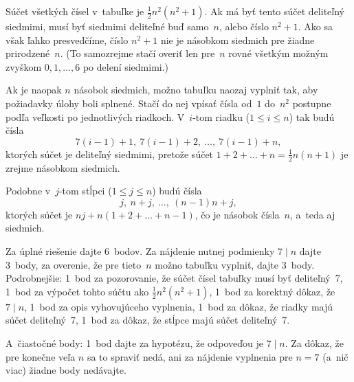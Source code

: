 {%
Súčet všetkých čísel v~tabuľke je $\frac12n^2(n^2+1)$.
Ak má byť tento súčet deliteľný siedmimi, musí byť siedmimi deliteľné
buď samo~$n$, alebo číslo $n^2+1$. Ako sa však ľahko presvedčíme,
číslo $n^2+1$ nie je násobkom siedmich pre žiadne prirodzené~$n$. (To
samozrejme stačí overiť len pre~$n$ rovné všetkým možným zvyškom
$0, 1,\dots, 6$ po delení siedmimi.)

Ak je naopak $n$ násobok siedmich, možno tabuľku naozaj vyplniť tak, aby
požiadavky úlohy boli splnené. Stačí do nej vpísať čísla od~$1$ do~$n^2$
postupne podľa veľkosti po jednotlivých riadkoch.
V~$i$-tom riadku ($1\le i\le n$) tak budú čísla
$$
7(i-1)+1,\ 7(i-1)+2,\ \dots,\ 7(i-1)+n,
$$
ktorých súčet je deliteľný siedmimi, pretože súčet $1+2+\dots+n=\frac12n(n+1)$
je zrejme násobkom siedmich.

Podobne v~$j$-tom stĺpci ($1\le j\le n$) budú čísla
$$
j,\ n+j,\ \dots,\ (n-1) n+j,
$$
ktorých súčet je $nj+n(1+2+\dots+n-1)$, čo je násobok čísla~$n$, a~teda aj siedmich.

\nobreak\medskip\petit\noindent
Za úplné riešenie dajte 6~bodov.
Za nájdenie nutnej podmienky $7\mid n$ dajte 3~body, za overenie,
že pre tieto~$n$ možno tabuľku vyplniť, dajte 3~body.
Podrobnejšie:
1~bod za pozorovanie, že súčet čísel tabuľky musí byť deliteľný~7,
1~bod za výpočet tohto súčtu ako $\frac12n ^ 2 (n ^ 2 + 1)$,
1~bod za korektný dôkaz, že $7 \mid n$,
1~bod za opis vyhovujúceho vyplnenia,
1~bod za dôkaz, že riadky majú súčet deliteľný~7,
1~bod za dôkaz, že stĺpce majú súčet deliteľný~7.

A~čiastočné body:
1~bod dajte za hypotézu, že odpoveďou je $7 \mid n$.
Za dôkaz, že pre konečne veľa $n$ sa to spraviť nedá, ani
za nájdenie vyplnenia pre $n = 7$ (a~nič viac) žiadne body nedávajte.
\endpetit
\bigbreak
}

